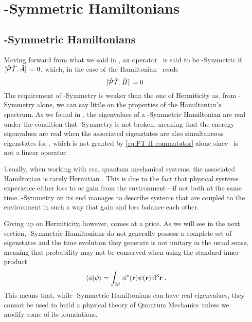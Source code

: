 \chapter{\PT-Symmetric Hamiltonians}\label{ch:pt-symmetric-hamiltonians}
    \section{\PT-Symmetric Hamiltonians}
        Moving forward from what we said in , an operator \hA\ is said to be \PT-Symmetric if $\comm*{\hPT}{\hA} = 0$, which, in the case of the Hamiltonian \hH\ reads
        \begin{equation}
            \label{eq:PT-H-commutator}
            \comm*{\hPT}{\hH} = 0
            \myperiod
        \end{equation}
        The requirement of \PT-Symmetry is weaker than the one of Hermiticity as, from \PT-Symmetry alone, we can say little on the properties of the Hamiltonian's spectrum. As we found in , the eigenvalues of a \PT-Symmetric Hamiltonian are real under the condition that \PT-Symmetry is not broken, meaning that the eneregy eigenvalues are real when the associated eigenstates are also simultaneous eigenstates for \hPT, which is not granted by \eqref{eq:PT-H-commutator} alone since \hPT\ is not a linear operator.

        Usually, when working with real quantum mechanical systems, the associated Hamiltonian is rarely Hermitian \cite{bender2024}. This is due to the fact that physical systems experience either loss to or gain from the environment---if not both at the same time. \PT-Symmetry on its end manages to describe systems that are coupled to the environment in such a way that gain and loss balance each other.

        Giving up on Hermiticity, however, comes at a price. As we will see in the next section, \PT-Symmetric Hamiltonians do not generally possess a complete set of eigenstates and the time evolution they generate is not unitary in the usual sense, meaning that probability may not be conserved when using the standard inner product
        \begin{equation}
            \label{eq:standard-inner-product}
            \braket{\phi}{\psi} = \int\nolimits_{\bbR^3} \phi^*\pqty{\vb{r}} \psi\pqty{\vb{r}} \dd[3]{\vb{r}}
            \myperiod
        \end{equation}
        This means that, while \PT-Symmetric Hamiltonians can have real eigenvalues, they cannot be used to build a physical theory of Quantum Mechanics unless we modify some of its foundations.

